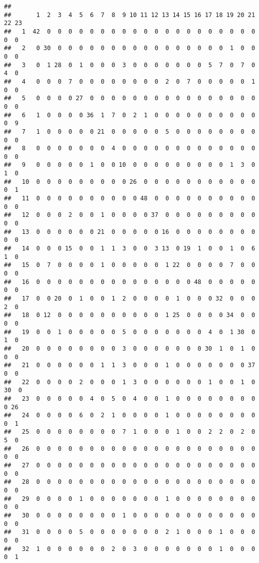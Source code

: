 \documentclass[]{article}
\begin{document}
\begin{verbatim}
##     
##       1  2  3  4  5  6  7  8  9 10 11 12 13 14 15 16 17 18 19 20 21 22 23
##   1  42  0  0  0  0  0  0  0  0  0  0  0  0  0  0  0  0  0  0  0  0  0  0
##   2   0 30  0  0  0  0  0  0  0  0  0  0  0  0  0  0  0  0  1  0  0  0  0
##   3   0  1 28  0  1  0  0  0  3  0  0  0  0  0  0  0  5  7  0  7  0  4  0
##   4   0  0  0  7  0  0  0  0  0  0  0  0  2  0  7  0  0  0  0  0  1  0  0
##   5   0  0  0  0 27  0  0  0  0  0  0  0  0  0  0  0  0  0  0  0  0  0  0
##   6   1  0  0  0  0 36  1  7  0  2  1  0  0  0  0  0  0  0  0  0  0  0  9
##   7   1  0  0  0  0  0 21  0  0  0  0  0  5  0  0  0  0  0  0  0  0  0  0
##   8   0  0  0  0  0  0  0  4  0  0  0  0  0  0  0  0  0  0  0  0  0  0  0
##   9   0  0  0  0  0  1  0  0 10  0  0  0  0  0  0  0  0  0  1  3  0  1  0
##   10  0  0  0  0  0  0  0  0  0 26  0  0  0  0  0  0  0  0  0  0  0  0  1
##   11  0  0  0  0  0  0  0  0  0  0 48  0  0  0  0  0  0  0  0  0  0  0  0
##   12  0  0  0  2  0  0  1  0  0  0  0 37  0  0  0  0  0  0  0  0  0  0  0
##   13  0  0  0  0  0  0 21  0  0  0  0  0 16  0  0  0  0  0  0  0  0  0  0
##   14  0  0  0 15  0  0  1  1  3  0  0  3 13  0 19  1  0  0  1  0  6  1  0
##   15  0  7  0  0  0  0  1  0  0  0  0  0  1 22  0  0  0  0  7  0  0  0  0
##   16  0  0  0  0  0  0  0  0  0  0  0  0  0  0  0 48  0  0  0  0  0  0  0
##   17  0  0 20  0  1  0  0  1  2  0  0  0  0  1  0  0  0 32  0  0  0  2  0
##   18  0 12  0  0  0  0  0  0  0  0  0  0  1 25  0  0  0  0 34  0  0  0  0
##   19  0  0  1  0  0  0  0  0  5  0  0  0  0  0  0  0  4  0  1 30  0  1  0
##   20  0  0  0  0  0  0  0  0  3  0  0  0  0  0  0  0 30  1  0  1  0  0  0
##   21  0  0  0  0  0  0  1  1  3  0  0  0  1  0  0  0  0  0  0  0 37  0  0
##   22  0  0  0  0  2  0  0  0  1  3  0  0  0  0  0  0  1  0  0  1  0 30  0
##   23  0  0  0  0  0  4  0  5  0  4  0  0  1  0  0  0  0  0  0  0  0  0 26
##   24  0  0  0  0  6  0  2  1  0  0  0  0  1  0  0  0  0  0  0  0  0  0  1
##   25  0  0  0  0  0  0  0  0  7  1  0  0  0  1  0  0  2  2  0  2  0  5  0
##   26  0  0  0  0  0  0  0  0  0  0  0  0  0  0  0  0  0  0  0  0  0  0  0
##   27  0  0  0  0  0  0  0  0  0  0  0  0  0  0  0  0  0  0  0  0  0  0  0
##   28  0  0  0  0  0  0  0  0  0  0  0  0  0  0  0  0  0  0  0  0  0  0  0
##   29  0  0  0  0  1  0  0  0  0  0  0  0  1  0  0  0  0  0  0  0  0  0  0
##   30  0  0  0  0  0  0  0  0  1  0  0  0  0  0  0  0  0  0  0  0  0  0  0
##   31  0  0  0  0  5  0  0  0  0  0  0  0  2  1  0  0  0  1  0  0  0  0  0
##   32  1  0  0  0  0  0  0  2  0  3  0  0  0  0  0  0  0  1  0  0  0  0  1

\end{verbatim}
\end{document}
